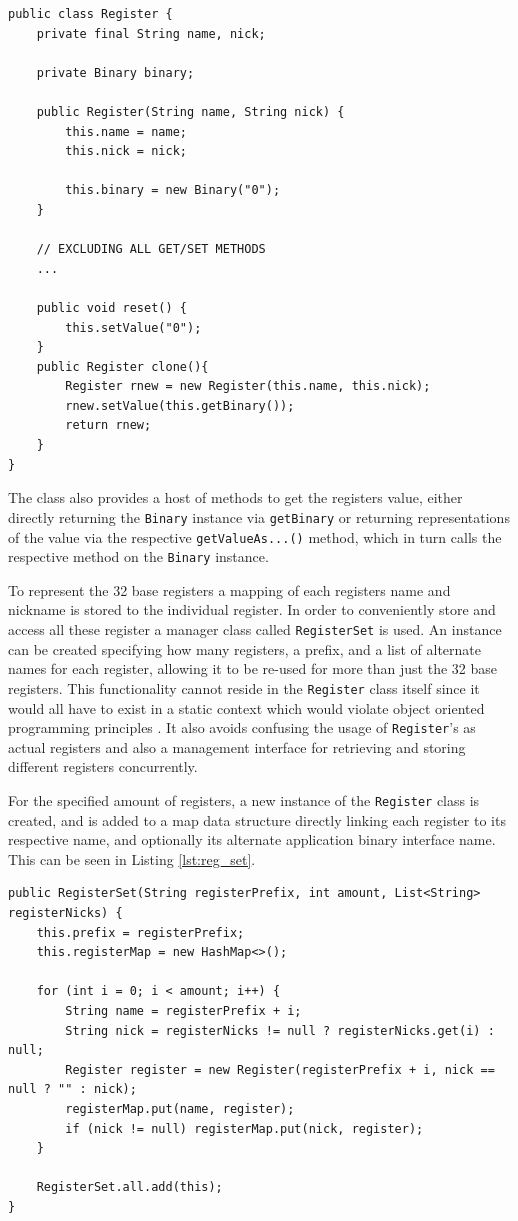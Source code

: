 \begin{lstlisting}[caption=Register Implementation, label=lst:register]
public class Register {
    private final String name, nick;

    private Binary binary;

    public Register(String name, String nick) {
        this.name = name;
        this.nick = nick;

        this.binary = new Binary("0");
    }

    // EXCLUDING ALL GET/SET METHODS 
    ...

    public void reset() {
        this.setValue("0");
    }
    public Register clone(){
        Register rnew = new Register(this.name, this.nick);
        rnew.setValue(this.getBinary());
        return rnew;
    }
}
\end{lstlisting}

The class also provides a host of methods to get the registers value, either directly returning the \texttt{Binary} instance via \texttt{getBinary} or returning representations of the value via the respective \texttt{getValueAs...()} method, which in turn calls the respective method on the \texttt{Binary} instance.

To represent the 32 base registers a mapping of each registers name and nickname is stored to the individual register. In order to conveniently store and access all these register a manager class called \texttt{RegisterSet} is used. An instance can be created specifying how many registers, a prefix, and a list of alternate names for each register, allowing it to be re-used for more than just the 32 base registers. This functionality cannot reside in the \texttt{Register} class itself since it would all have to exist in a static context which would violate object oriented programming principles \cite{wegner_1990_concepts}. It also avoids confusing the usage of \texttt{Register}'s as actual registers and also a management interface for retrieving and storing different registers concurrently.

For the specified amount of registers, a new instance of the \texttt{Register} class is created, and is added to a map data structure directly linking each register to its respective name, and optionally its alternate application binary interface name. This can be seen in Listing \ref{lst:reg_set}.

\begin{lstlisting}[caption=RegisterSet generation, label=lst:reg_set]
 public RegisterSet(String registerPrefix, int amount, List<String> registerNicks) {
    this.prefix = registerPrefix;
    this.registerMap = new HashMap<>();

    for (int i = 0; i < amount; i++) {
        String name = registerPrefix + i;
        String nick = registerNicks != null ? registerNicks.get(i) : null;
        Register register = new Register(registerPrefix + i, nick == null ? "" : nick);
        registerMap.put(name, register);
        if (nick != null) registerMap.put(nick, register);
    }

    RegisterSet.all.add(this);
}
\end{lstlisting}

